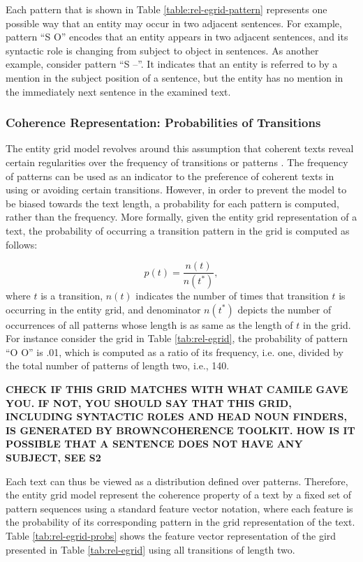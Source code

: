 Each pattern that is shown in Table \ref{table:rel-egrid-pattern} represents one possible way that an entity may occur in two adjacent sentences. 
For example, pattern ``S O'' encodes that an entity appears in two adjacent sentences, and its syntactic role is changing from subject to object in sentences. 
As another example, consider pattern ``S --''. 
It indicates that an entity is referred to by a mention in the subject position of a sentence, but the entity has no mention in the immediately next sentence in the examined text.  

\subsubsection{Coherence Representation: Probabilities of Transitions}
%
The entity grid model revolves around this assumption that coherent texts reveal certain regularities over the frequency of transitions or patterns \cite{barzilay05a,barzilay08}.    
The frequency of patterns can be used as an indicator to the preference of coherent texts in using or avoiding certain transitions. 
However, in order to prevent the model to be biased towards the text length, a probability for each pattern is computed, rather than the frequency. 	 
More formally, given the entity grid representation of a text, the probability of occurring a transition pattern in the grid is computed as follows:

\begin{equation}
p(t) = \frac{n(t)}{n(t^*)},
\end{equation}
where $t$ is a transition, $n(t)$ indicates the number of times that transition $t$ is occurring in the entity grid, and denominator $n(t^*)$ depicts the number of occurrences of all patterns whose length is as same as the length of $t$ in the grid. 
For instance consider the grid in Table \ref{tab:rel-egrid}, the probability of pattern ``O O'' is .01, which is computed as a ratio of its frequency, i.e. one, divided by the total number of patterns of length two, i.e., 140. 

\textbf{CHECK IF THIS GRID MATCHES WITH WHAT CAMILE GAVE YOU. IF NOT, YOU SHOULD SAY THAT THIS GRID, INCLUDING SYNTACTIC ROLES AND HEAD NOUN FINDERS, IS GENERATED BY BROWNCOHERENCE TOOLKIT. 
HOW IS IT POSSIBLE THAT A SENTENCE DOES NOT HAVE ANY SUBJECT, SEE S2}   

Each text can thus be viewed as a distribution defined over patterns. 
Therefore, the entity grid model represent the coherence property of a text by a fixed set of pattern sequences using a standard feature vector notation, where each feature is the probability of its corresponding pattern in the grid representation of the text.  
Table \ref{tab:rel-egrid-probs} shows the feature vector representation of the gird presented in Table \ref{tab:rel-egrid} using all transitions of length two. 

